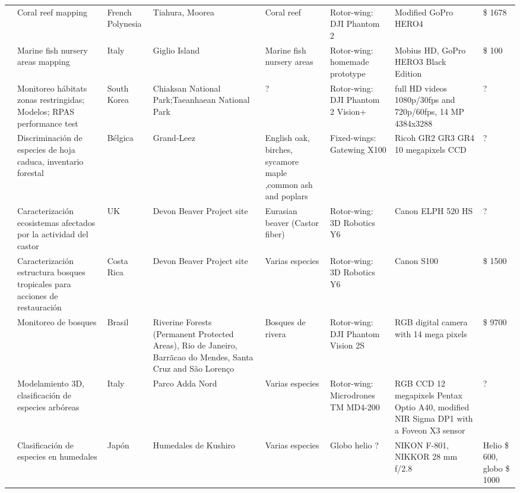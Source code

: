 \begin{landscape}
\begin{longtabu}{p{1cm}p{3cm}p{1cm}p{3cm}p{2cm}p{4cm}p{3.5cm}p{1.5cm}}
\cite{casella_mapping_2017}  & Coral reef mapping & French Polynesia & Tiahura, Moorea & Coral reef  & Rotor-wing: DJI Phantom 2 & Modified GoPro HERO4  & \$ 1678 \\ 

\cite{ventura_low-cost_2016}  & Marine fish nursery areas mapping  & Italy & Giglio Island & Marine fish nursery areas  & Rotor-wing: homemade prototype & Mobius HD, GoPro HERO3 Black Edition  & \$ 100 \\ 


\cite{ivosevic_use_2015}  & Monitoreo hábitats zonas restringidas; Modelos; RPAS performance test & South Korea & Chiaksan National Park;Taeanhaean National Park &  ? & Rotor-wing: DJI Phantom 2 Vision+  & full HD videos 1080p/30fps and 720p/60fps, 14 MP 4384x3288 & ? \\ 
  
\cite{lisein_discrimination_2015}  & Discriminación de especies de  hoja caduca, inventario forestal & Bélgica & Grand-Leez & English oak, birches, sycamore maple ,common ash and poplars & Fixed-wings: Gatewing X100  & Ricoh GR2 GR3 GR4 10 megapixels CCD  & ?  \\ 
  
\cite{puttock_aerial_2015}  & Caracterización ecosistemas afectados por la actividad del castor & UK & Devon Beaver Project site & Eurasian beaver (Castor fiber) & Rotor-wing: 3D Robotics Y6 & Canon ELPH 520 HS  & ?  \\ 
  
\cite{zahawi_using_2015} & Caracterización estructura bosques tropicales para acciones de restauración & Costa Rica & Devon Beaver Project site & Varias especies & Rotor-wing: 3D Robotics Y6 & Canon S100  & \$ 1500 \\ 
  
\cite{bustamante_forest_2015}  &  Monitoreo de bosques & Brasil & Riverine Forests (Permanent Protected Areas), Rio de Janeiro, Barrãcao do Mendes, Santa Cruz and São Lorenço & Bosques de rivera & Rotor-wing: DJI Phantom Vision 2S   & RGB digital camera with 14 mega pixels & \$ 9700  \\ 
  
\cite{gini_aerial_2012}  & Modelamiento 3D, clasificación de especies arbóreas & Italy & Parco Adda Nord &  Varias especies &  Rotor-wing: Microdrones TM MD4-200 & RGB CCD 12 megapixels Pentax Optio A40, modified NIR Sigma DP1 with a Foveon X3 sensor  & ?  \\

\cite{miyamoto_use_2004} & Clasificación de especies en humedales & Japón & Humedales de Kushiro &  Varias especies & Globo helio ? & NIKON F-801, NIKKOR 28 mm f/2.8  & Helio \$ 600, globo \$ 1000  \\ 


\end{longtabu}
\end{landscape}
